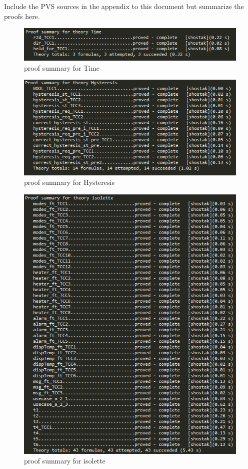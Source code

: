 \documentclass[fontsize=12pt,paper=letter,twoside]{scrartcl}
\begin{document}
Include the PVS sources in the appendix to this document but summarize the proofs here.

\begin{figure}[!htb]
\begin{center}
\includegraphics[width=.8\textwidth]{pics/prf_Time.png}
\end{center}
\caption{proof summary for Time}
\label{fig:Time}
\end{figure}

\begin{figure}[!htb]
\begin{center}
\includegraphics[width=.8\textwidth]{pics/prf_Hysteresis.png}
\end{center}
\caption{proof summary for Hysteresis}
\label{fig:Hysteresis}
\end{figure}

\begin{figure}[!htb]
\begin{center}
\includegraphics[width=.8\textwidth]{pics/prf_isolette.png}
\end{center}
\caption{proof summary for isolette}
\label{fig:prfisolette}
\end{figure}
\end{document}
